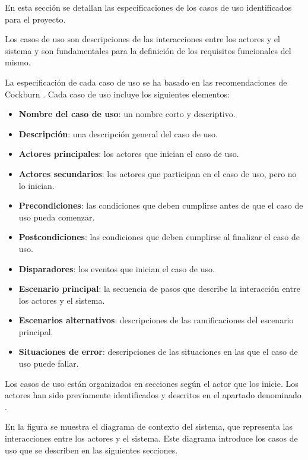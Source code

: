 En esta sección se detallan las especificaciones de los casos de uso identificados para el proyecto. 

Los casos de uso son descripciones de las interacciones entre los actores y el sistema y son fundamentales para la definición de los requisitos funcionales del mismo.

La especificación de cada caso de uso se ha basado en las recomendaciones de Cockburn \cite{cockburn2000writing}. Cada caso de uso incluye los siguientes elementos:
\begin{itemize}
    \item \textbf{Nombre del caso de uso}: un nombre corto y descriptivo.
    \item \textbf{Descripción}: una descripción general del caso de uso.
    \item \textbf{Actores principales}: los actores que inician el caso de uso.
    \item \textbf{Actores secundarios}: los actores que participan en el caso de uso, pero no lo inician.
    \item \textbf{Precondiciones}: las condiciones que deben cumplirse antes de que el caso de uso pueda comenzar.
    \item \textbf{Postcondiciones}: las condiciones que deben cumplirse al finalizar el caso de uso.
    \item \textbf{Disparadores}: los eventos que inician el caso de uso.
    \item \textbf{Escenario principal}: la secuencia de pasos que describe la interacción entre los actores y el sistema.
    \item \textbf{Escenarios alternativos}: descripciones de las ramificaciones del escenario principal.
    \item \textbf{Situaciones de error}: descripciones de las situaciones en las que el caso de uso puede fallar.
\end{itemize}


Los casos de uso están organizados en secciones según el actor que los inicie. Los actores han sido previamente identificados y descritos en el apartado denominado
.

En la figura 
se muestra el diagrama de contexto del sistema, que representa las interacciones entre los actores y el sistema. 
Este diagrama introduce los casos de uso que se describen en las siguientes secciones.

